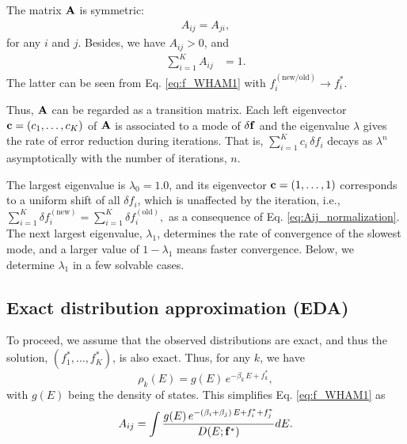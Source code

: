 \documentclass[reprint,aip,jcp,superscriptaddress]{revtex4-1}
\begin{document}
The matrix $\mathbf{A}$ is symmetric:
%
\begin{align}
  A_{ij} = A_{ji},
\label{eq:Aij_symmetry}
\end{align}
%
for any $i$ and $j$.
%
Besides, we have
$A_{ij} > 0$, and
%
\begin{align}
\sum_{i = 1}^K A_{ij} &= 1.
\label{eq:Aij_normalization}
\end{align}
%
The latter can be seen from
Eq. \eqref{eq:f_WHAM1}
with
$f_i^\mathrm{(new/old)} \rightarrow f_i^*$.



Thus,
$\mathbf{A}$
can be regarded as a transition matrix\cite{
newman}.
%
Each left eigenvector
$\mathbf{c} = (c_1, \dots, c_K)$
of $\mathbf{A}$
is associated to a mode of $\delta \mathbf{f}$
and the eigenvalue $\lambda$
gives the rate of error reduction
during iterations.
%
That is,
$\sum_{i = 1}^K c_i \, \delta f_i$
decays as $\lambda^n$
asymptotically
with the number of iterations, $n$.




The largest eigenvalue is $\lambda_0 = 1.0$,
and its eigenvector
$\mathbf{c} = (1, \dots, 1)$
corresponds to a uniform shift of all
$\delta f_i$,
which is unaffected by the iteration,
%
i.e.,
$
\sum_{i=1}^K \delta f_i^\mathrm{(new)}
=
\sum_{i=1}^K \delta f_i^\mathrm{(old)},
$
as a consequence of
Eq. \eqref{eq:Aij_normalization}.
%
The next largest eigenvalue,
$\lambda_1$,
determines the rate of convergence
of the slowest mode,
%
and a larger value of
$1 - \lambda_1$
means faster convergence.
%
Below,
we determine $\lambda_1$
in a few solvable cases.



\subsection{Exact distribution approximation (EDA)}



To proceed, we assume that
the observed distributions are exact,
%
and thus the solution,
$(f_1^*, \dots, f_K^*)$,
is also exact.
%
Thus, for any $k$, we have
%
\begin{equation}
\rho_k(E)
=
g(E) \,
e^{-\beta_k \, E + f_k^*},
\label{eq:rho_EDA}
\end{equation}
%
with $g(E)$ being the density of states.
%
%
This simplifies Eq. \eqref{eq:f_WHAM1} as
%
\begin{align}
A_{ij}
=
\int
\frac
{
  g(E) \, e^{ -(\beta_i + \beta_j) \, E + f_i^* + f_j^*}
}
{
  D(E; \mathbf{f}^*)
}
dE.
\label{eq:Aij_EDA}
\end{align}
\end{document}
